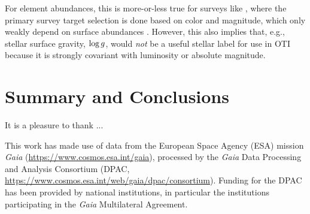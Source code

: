 For element abundances, this is more-or-less true for surveys like \apogee, where the
primary survey target selection is done based on color and magnitude, which only weakly
depend on surface abundances \citep{ZasowskiXX, SantanaXX, BeatonXX}.
However, this also implies that, e.g., stellar surface gravity, $\log g$, would
\emph{not} be a useful stellar label for use in OTI because it is strongly covariant
with luminosity or absolute magnitude.



\section{Summary and Conclusions} \label{sec:conclusions}


\begin{acknowledgements}

It is a pleasure to thank ...



This work has made use of data from the European Space Agency (ESA) mission
{\it Gaia} (\url{https://www.cosmos.esa.int/gaia}), processed by the {\it Gaia}
Data Processing and Analysis Consortium (DPAC,
\url{https://www.cosmos.esa.int/web/gaia/dpac/consortium}). Funding for the DPAC
has been provided by national institutions, in particular the institutions
participating in the {\it Gaia} Multilateral Agreement.

\end{acknowledgements}


